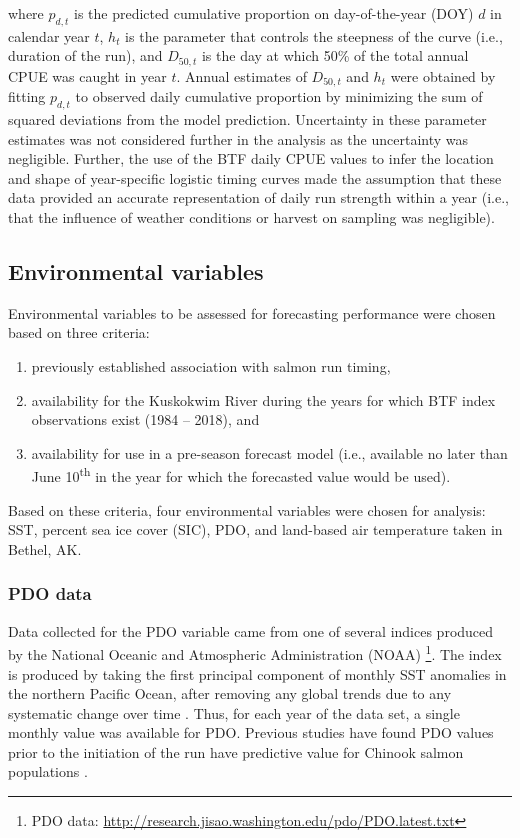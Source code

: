 \documentclass[12pt,]{book}
\providecommand{\tightlist}{%
  \setlength{\itemsep}{0pt}\setlength{\parskip}{0pt}}
\let\rmarkdownfootnote\footnote%
\def\footnote{\protect\rmarkdownfootnote}
\theoremstyle{definition}
\theoremstyle{definition}
\theoremstyle{definition}
\theoremstyle{remark}
\begin{document}
\noindent
where \(p_{d,t}\) is the predicted cumulative proportion on
day-of-the-year (DOY) \(d\) in calendar year \(t\), \(h_t\) is the
parameter that controls the steepness of the curve (i.e., duration of
the run), and \(D_{50,t}\) is the day at which 50\% of the total annual
CPUE was caught in year \(t\). Annual estimates of \(D_{50,t}\) and
\(h_t\) were obtained by fitting \(p_{d,t}\) to observed daily
cumulative proportion by minimizing the sum of squared deviations from
the model prediction. Uncertainty in these parameter estimates was not
considered further in the analysis as the uncertainty was negligible.
Further, the use of the BTF daily CPUE values to infer the location and
shape of year-specific logistic timing curves made the assumption that
these data provided an accurate representation of daily run strength
within a year (i.e., that the influence of weather conditions or harvest
on sampling was negligible).

\subsection{Environmental variables}\label{environmental-variables}

\noindent
Environmental variables to be assessed for forecasting performance were
chosen based on three criteria:

\begin{enumerate}
\def\labelenumi{(\arabic{enumi})}
\tightlist
\item
  previously established association with salmon run timing,
\item
  availability for the Kuskokwim River during the years for which BTF
  index observations exist (1984 -- 2018), and
\item
  availability for use in a pre-season forecast model (i.e., available
  no later than June 10\textsuperscript{th} in the year for which the
  forecasted value would be used).
\end{enumerate}

\noindent
Based on these criteria, four environmental variables were chosen for
analysis: SST, percent sea ice cover (SIC), PDO, and land-based air
temperature taken in Bethel, AK.

\subsubsection{PDO data}\label{pdo-data}

\noindent
Data collected for the PDO variable came from one of several indices
produced by the National Oceanic and Atmospheric Administration (NOAA)
\citep{mantua-etal-1997}\footnote{PDO data:
  \url{http://research.jisao.washington.edu/pdo/PDO.latest.txt}}. The
index is produced by taking the first principal component of monthly SST
anomalies in the northern Pacific Ocean, after removing any global
trends due to any systematic change over time \citep{mantua-etal-1997}.
Thus, for each year of the data set, a single monthly value was
available for PDO. Previous studies have found PDO values prior to the
initiation of the run have predictive value for Chinook salmon
populations \citep{beer-2007, keefer-etal-2008}.
\end{document}
